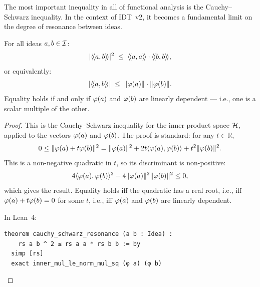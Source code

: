 The most important inequality in all of functional analysis is the
Cauchy--Schwarz inequality. In the context of IDT~v2, it becomes a fundamental
limit on the degree of resonance between ideas.

\begin{theorem}
\label{thm:cauchy-schwarz}
For all ideas $a, b \in \mathcal{I}$:
\[
  |\langle\!\langle a, b \rangle\!\rangle|^2 \;\leq\; \langle\!\langle a, a \rangle\!\rangle \cdot \langle\!\langle b, b \rangle\!\rangle,
\]
or equivalently:
\[
  |\langle\!\langle a, b \rangle\!\rangle| \;\leq\; \lVert \varphi(a) \rVert \cdot \lVert \varphi(b) \rVert.
\]
Equality holds if and only if $\varphi(a)$ and $\varphi(b)$ are linearly dependent
--- i.e., one is a scalar multiple of the other.
\end{theorem}

\begin{proof}
This is the Cauchy--Schwarz inequality for the inner product space $\mathcal{H}$,
applied to the vectors $\varphi(a)$ and $\varphi(b)$. The proof is standard:
for any $t \in \mathbb{R}$,
\[
  0 \leq \lVert \varphi(a) + t\varphi(b) \rVert^2
  = \lVert \varphi(a) \rVert^2 + 2t\langle \varphi(a), \varphi(b) \rangle + t^2\lVert \varphi(b) \rVert^2.
\]
This is a non-negative quadratic in $t$, so its discriminant is non-positive:
\[
  4\langle \varphi(a), \varphi(b) \rangle^2 - 4\lVert \varphi(a) \rVert^2\lVert \varphi(b) \rVert^2 \leq 0,
\]
which gives the result. Equality holds iff the quadratic has a real root, i.e.,
iff $\varphi(a) + t\varphi(b) = 0$ for some $t$, i.e., iff $\varphi(a)$ and
$\varphi(b)$ are linearly dependent.

In Lean~4:
\begin{lstlisting}
theorem cauchy_schwarz_resonance (a b : Idea) :
    rs a b ^ 2 ≤ rs a a * rs b b := by
  simp [rs]
  exact inner_mul_le_norm_mul_sq (φ a) (φ b)
\end{lstlisting}
\end{proof}

